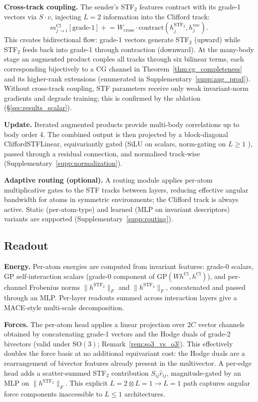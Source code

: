 \textbf{Cross-track coupling.} The sender's STF$_2$ features contract with its grade-1 vectors via $S \cdot v$, injecting $L{=}2$ information into the Clifford track:
\[
m^{\mathrm{Cl}}_{j \to i}[\text{grade-1}] \mathrel{+}= W_{\mathrm{cross}} \cdot \mathrm{contract}(h_j^{\mathrm{STF}_2}, h_j^{\mathrm{vec}}).
\]
This creates bidirectional flow: grade-1 vectors generate STF$_2$ (upward) while STF$_2$ feeds back into grade-1 through contraction (downward). At the many-body stage an augmented product couples all tracks through six bilinear terms, each corresponding bijectively to a CG channel in Theorem~\ref{thm:cg_completeness} and its higher-rank extensions (enumerated in Supplementary~\ref{supp:aug_prod}). Without cross-track coupling, STF parameters receive only weak invariant-norm gradients and degrade training; this is confirmed by the ablation (\S\ref{sec:results_scalar}).

\textbf{Update.} Iterated augmented products provide multi-body correlations up to body order 4. The combined output is then projected by a block-diagonal CliffordSTFLinear, equivariantly gated (SiLU on scalars, norm-gating on $L \geq 1$ \citep{weiler20183d}), passed through a residual connection, and normalised track-wise (Supplementary~\ref{supp:normalization}).

\textbf{Adaptive routing (optional).} A routing module applies per-atom multiplicative gates to the STF tracks between layers, reducing effective angular bandwidth for atoms in symmetric environments; the Clifford track is always active. Static (per-atom-type) and learned (MLP on invariant descriptors) variants are supported (Supplementary~\ref{supp:routing}).

\subsection{Readout}\label{sec:readout}

\textbf{Energy.} Per-atom energies are computed from invariant features: grade-0 scalars, GP self-interaction scalars (grade-0 component of $\mathrm{GP}(W h^{\mathrm{Cl}}, h^{\mathrm{Cl}})$), and per-channel Frobenius norms $\lVert h^{\mathrm{STF}_2}\rVert_F$ and $\lVert h^{\mathrm{STF}_3}\rVert_F$, concatenated and passed through an MLP. Per-layer readouts summed across interaction layers give a MACE-style multi-scale decomposition.

\textbf{Forces.} The per-atom head applies a linear projection over $2C$ vector channels obtained by concatenating grade-1 vectors and the Hodge duals of grade-2 bivectors (valid under $\mathrm{SO}(3)$; Remark~\ref{rem:so3_vs_o3}). This effectively doubles the force basis at no additional equivariant cost: the Hodge duals are a rearrangement of bivector features already present in the multivector. A per-edge head adds a scatter-summed STF$_2$ contribution $S_{ij}\hat{r}_{ij}$, magnitude-gated by an MLP on $\lVert h^{\mathrm{STF}_2}\rVert_F$. This explicit $L{=}2 \otimes L{=}1 \to L{=}1$ path captures angular force components inaccessible to $L \leq 1$ architectures.
